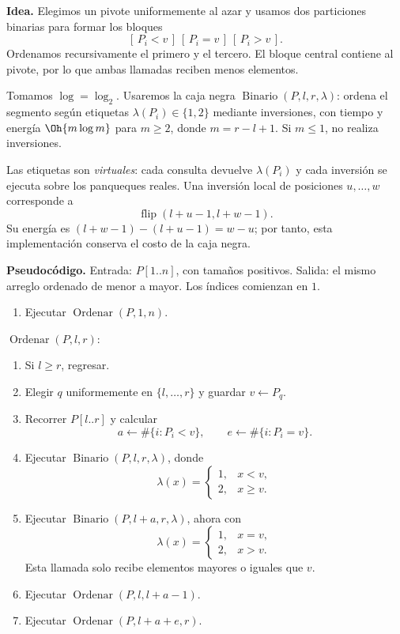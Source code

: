 
\textbf{Idea.} Elegimos un pivote uniformemente al azar y usamos dos particiones binarias para formar los bloques
\[
[\,P_i<v\,]\ [\,P_i=v\,]\ [\,P_i>v\,].
\]
Ordenamos recursivamente el primero y el tercero. El bloque central contiene al pivote, por lo que ambas llamadas reciben menos elementos.

Tomamos $\log=\log_2$. Usaremos la caja negra $\operatorname{Binario}(P,l,r,\lambda)$: ordena el segmento según etiquetas $\lambda(P_i)\in\{1,2\}$ mediante inversiones, con tiempo y energía $\Oh{m\log m}$ para $m\ge2$, donde $m=r-l+1$. Si $m\le1$, no realiza inversiones.

Las etiquetas son \emph{virtuales}: cada consulta devuelve $\lambda(P_i)$ y cada inversión se ejecuta sobre los panqueques reales. Una inversión local de posiciones $u,\ldots,w$ corresponde a
\[
\operatorname{flip}(l+u-1,l+w-1).
\]
Su energía es $(l+w-1)-(l+u-1)=w-u$; por tanto, esta implementación conserva el costo de la caja negra.

\textbf{Pseudocódigo.} Entrada: $P[1..n]$, con tamaños positivos. Salida: el mismo arreglo ordenado de menor a mayor. Los índices comienzan en $1$.

\begin{enumerate}
\item Ejecutar $\operatorname{Ordenar}(P,1,n)$.
\end{enumerate}

\noindent$\operatorname{Ordenar}(P,l,r)$:
\begin{enumerate}
\item Si $l\ge r$, regresar.
\item Elegir $q$ uniformemente en $\{l,\ldots,r\}$ y guardar $v\gets P_q$.
\item Recorrer $P[l..r]$ y calcular
\[
a\gets \#\{i:P_i<v\},\qquad e\gets \#\{i:P_i=v\}.
\]
\item Ejecutar $\operatorname{Binario}(P,l,r,\lambda)$, donde
\[
\lambda(x)=
\begin{cases}
1,&x<v,\\
2,&x\ge v.
\end{cases}
\]
\item Ejecutar $\operatorname{Binario}(P,l+a,r,\lambda)$, ahora con
\[
\lambda(x)=
\begin{cases}
1,&x=v,\\
2,&x>v.
\end{cases}
\]
Esta llamada solo recibe elementos mayores o iguales que $v$.
\item Ejecutar $\operatorname{Ordenar}(P,l,l+a-1)$.
\item Ejecutar $\operatorname{Ordenar}(P,l+a+e,r)$.
\end{enumerate}

